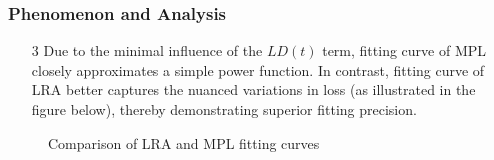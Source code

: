\documentclass[aspectratio=169]{beamer}
\begin{document}
    \begin{frame}
        \frametitle{Phenomenon and Analysis}
        \begin{enumerate}
            \item[3] Due to the minimal influence of the $LD(t)$ term, fitting curve of MPL closely approximates a simple power function.
            In contrast, fitting curve of LRA better captures the nuanced variations in loss (as illustrated in the figure below), thereby demonstrating superior fitting precision.
        \end{enumerate}
        \begin{figure}
            \centering

            \caption{Comparison of LRA and MPL fitting curves}\label{fig:figure3}
        \end{figure}
    \end{frame}
\end{document}
